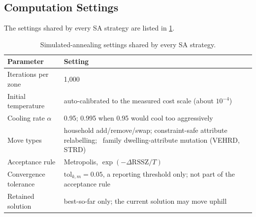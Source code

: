 \documentclass[review]{elsarticle}
\begin{document}
\subsection{Computation Settings}
The settings shared by every SA strategy are listed in \cref{tab:sa_settings}.
\begin{table}[H]
\centering
\small
\caption{Simulated-annealing settings shared by every SA strategy.}
\label{tab:sa_settings}
\begin{tabular}{@{}p{}p{}@{}}
\toprule
\textbf{Parameter} & \textbf{Setting} \\
\midrule
Iterations per zone & 1{,}000 \\
Initial temperature & auto-calibrated to the measured cost scale (about $10^{-4}$) \\
Cooling rate $\alpha$ & 0.95; 0.995 when 0.95 would cool too aggressively \\
Move types & household add/remove/swap; constraint-safe attribute relabelling; \ family dwelling-attribute mutation (VEHRD, STRD) \\
Acceptance rule & Metropolis, $\exp(-\Delta\text{RSSZ}/T)$ \\
Convergence tolerance & $\text{tol}_{k,m}=0.05$, a reporting threshold only; not part of the acceptance rule \\
Retained solution & best-so-far only; the current solution may move uphill \\
\bottomrule
\end{tabular}
\end{table}
\end{document}
